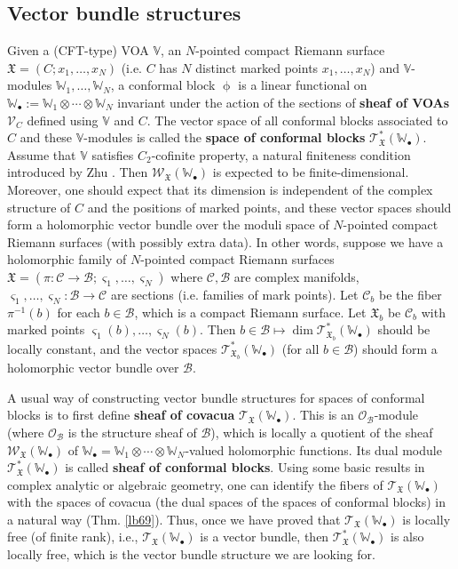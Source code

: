 \documentclass[12pt,b5paper,notitlepage]{report}
\theoremstyle{definition}
\theoremstyle{plain}
\newcommand{\fk}{\mathfrak}
\newcommand{\mc}{\mathcal}
\newcommand{\scr}{\mathscr}
\newcommand{\sgm}{\varsigma}
\newcommand{\blt}{\bullet}
\newcommand{\Vbb}{\mathbb V}
\newcommand{\Wbb}{\mathbb W}
\numberwithin{equation}{section}
\begin{document}
\subsection*{Vector bundle structures}


Given a (CFT-type) VOA $\Vbb$,   an $N$-pointed compact Riemann surface $\fk X=(C;x_1,\dots,x_N)$ (i.e. $C$ has $N$ distinct marked points $x_1,\dots,x_N$) and $\Vbb$-modules $\Wbb_1,\dots,\Wbb_N$, a conformal block $\upphi$ is a linear functional on $\Wbb_\blt:=\Wbb_1\otimes\cdots\otimes\Wbb_N$ invariant under the action of the sections of \textbf{sheaf of VOAs} $\scr V_C$ defined using $\Vbb$ and $C$. The vector space of all conformal blocks associated to $C$ and these $\Vbb$-modules is called the \textbf{space of conformal blocks} $\scr T_{\fk X}^*(\Wbb_\blt)$. Assume that $\Vbb$ satisfies $C_2$-cofinite property, a natural finiteness condition introduced by Zhu \cite{Zhu96}. Then  $\scr W_{\fk X}(\Wbb_\blt)$ is expected to be finite-dimensional. Moreover, one should expect that its dimension is independent of the complex structure of $C$ and the positions of marked points, and these vector spaces should form a holomorphic vector bundle over the moduli space of $N$-pointed compact Riemann surfaces (with possibly extra data). In other words, suppose we have a holomorphic family of $N$-pointed compact Riemann surfaces $\fk X=(\pi:\mc C\rightarrow\mc B;\sgm_1,\dots,\sgm_N)$ where $\mc C,\mc B$ are complex manifolds, $\sgm_1,\dots,\sgm_N:\mc B\rightarrow\mc C$ are sections (i.e. families of mark points). Let $\mc C_b$ be the fiber $\pi^{-1}(b)$ for each $b\in\mc B$, which is a compact Riemann surface. Let $\fk X_b$ be $\mc C_b$ with marked points $\sgm_1(b),\dots,\sgm_N(b)$. Then $b\in\mc B\mapsto\dim\scr T_{\fk X_b}^*(\Wbb_\blt)$ should be locally constant, and the vector spaces $\scr T_{\fk X_b}^*(\Wbb_\blt)$ (for all $b\in\mc B$) should form a holomorphic vector bundle over $\mc B$.
	
	
A usual way of constructing vector bundle structures for spaces of conformal blocks is to first define \textbf{sheaf of covacua} $\scr T_{\fk X}(\Wbb_\blt)$. This is an $\scr O_{\mc B}$-module (where $\scr O_{\mc B}$ is the structure sheaf of $\mc B$), which is locally a quotient of the sheaf $\scr W_{\fk X}(\Wbb_\blt)$ of $\Wbb_\blt=\Wbb_1\otimes\cdots\otimes\Wbb_N$-valued holomorphic functions. Its dual module $\scr T_{\fk X}^*(\Wbb_\blt)$ is called \textbf{sheaf of conformal blocks}. Using some basic results in complex analytic or algebraic geometry, one can identify the fibers of $\scr T_{\fk X}(\Wbb_\blt)$ with the spaces of covacua (the dual spaces of the spaces of conformal blocks) in a natural way (Thm. \ref{lb69}). Thus, once we have proved that $\scr T_{\fk X}(\Wbb_\blt)$ is locally free (of finite rank), i.e., $\scr T_{\fk X}(\Wbb_\blt)$ is a vector bundle, then $\scr T_{\fk X}^*(\Wbb_\blt)$ is also locally free, which is the vector bundle structure we are looking for. 
\end{document}
